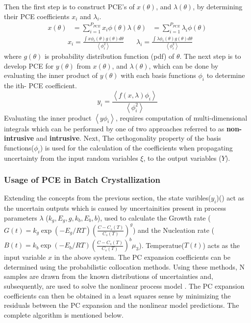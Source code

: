 \documentclass[3p,times,authoryear]{elsarticle}
\begin{document}
Then the first step is to construct PCE’s of $x(\theta)$, and $\lambda(\theta)$, by determining their PCE coefficients $x_{i}$ and $\lambda_{i}$.
\begin{align}
x(\theta) &= \sum_{i=1}^{P_{PCE}} x_{i}\phi(\theta)
\lambda(\theta) &= \sum_{i=1}^{P_{PCE}} \lambda_{i}\phi(\theta)
\end{align}
\begin{align}
&x_{i} = \frac{\int x\phi_{i}(\theta)g(\theta) d\theta}{\left\langle \phi^{2}_{i}\right\rangle } \quad
&\lambda_{i} = \frac{\int \lambda\phi_{i}(\theta)g(\theta) d\theta}{\left\langle \phi^{2}_{i}\right\rangle }
\end{align}
where $g(\theta)$ is probability distribution function (pdf) of $\theta$. 
The next step is to develop PCE for $y(\theta)$ from  $x(\theta)$, and $\lambda(\theta)$, which can be done by evaluating the
inner product of $y(\theta)$ with each basis functions $\phi_{i}$ to determine the ith- PCE coefficient.
\begin{equation}
y_{i} = \frac{\left\langle f(x,\lambda)\phi_{i} \right\rangle }{\left\langle \phi^{2}_{i} \right\rangle }
\end{equation}
Evaluating the inner product $\left\langle y\phi_{i} \right\rangle $, requires computation of multi-dimensional integrals which can be performed by one of two approaches referred to as \textbf{non-intrusive} and \textbf{intrusive}.
Next, The orthogonality property of the basis functions($\phi_{i}$) is used for the calculation of the coefficients when propagating uncertainty from the input random variables $\xi$, to the output variables ($Y$).
\par
\subsubsection{Usage of PCE in Batch Crystallization}

Extending the concepts from the previous section, the state varibles($y_{i}$)() act as the uncertain outputs which is caused by uncertainities present in process parameters $\lambda$ ($k_{g}, E_{g}, g, k_{b}, E_{b}, b$), used to calculate the Growth rate ($G(t) = k_{g}\exp{\left(-E_{g}/RT \right)}\left(\frac{C - C_{s}(T)}{C_{s}(T)}\right)^{g}$) and the Nucleation rate ($B(t) = k_{b}\exp{\left(-E_{b}/RT \right)}\left(\frac{C - C_{s}(T)}{C_{s}(T)}\right)^{b}\mu_{3}$). Temperatue($T(t)$) acts as the input variable $x$ in the above system. The PC expansion coefficients can be determined using the probabilistic collocation methods. Using these methods, N samples are drawn from the known distributions of uncertainties and, subsequently, are used to solve the nonlinear process model . The PC expansion coefficients can then be obtained in a least squares sense by minimizing the residuals between the PC expansion and the nonlinear model predictions. The complete algorithm is mentioned below.
\end{document}
